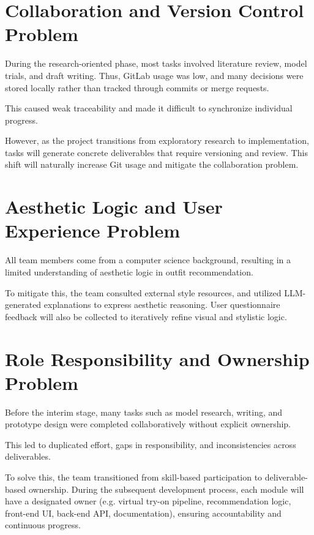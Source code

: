 \section{Collaboration and Version Control Problem}

During the research-oriented phase, most tasks involved literature review, model trials, and draft writing. Thus, GitLab usage was low, and many decisions were stored locally rather than tracked through commits or merge requests. 

This caused weak traceability and made it difficult to synchronize individual progress.


However, as the project transitions from exploratory research to implementation, tasks will generate concrete deliverables that require versioning and review. This shift will naturally increase Git usage and mitigate the collaboration problem.

\section{Aesthetic Logic and User Experience Problem}
All team members come from a computer science background, resulting in a limited understanding of aesthetic logic in outfit recommendation.

To mitigate this, the team consulted external style resources, and utilized LLM-generated explanations to express aesthetic reasoning. User questionnaire feedback will also be collected to iteratively refine visual and stylistic logic.

\section{Role Responsibility and Ownership Problem}
Before the interim stage, many tasks such as model research, writing, and prototype design were completed collaboratively without explicit ownership. 

This led to duplicated effort, gaps in responsibility, and inconsistencies across deliverables.

To solve this, the team transitioned from skill-based participation to deliverable-based ownership. During the subsequent development process, each module will have a designated owner (e.g. virtual try-on pipeline, recommendation logic, front-end UI, back-end API, documentation), ensuring accountability and continuous progress.